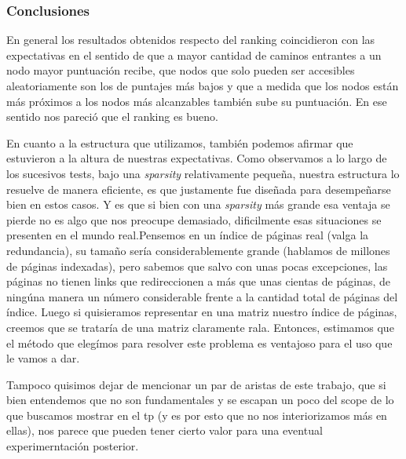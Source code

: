 \subsubsection*{Conclusiones}

En general los resultados obtenidos respecto del ranking coincidieron con las expectativas en el sentido de que a mayor cantidad de caminos entrantes a un nodo mayor puntuación recibe, que nodos que solo pueden ser accesibles aleatoriamente son los de puntajes más bajos y que a medida  que los nodos están más próximos a los nodos más alcanzables también sube su puntuación. En ese sentido nos pareció que el ranking es bueno.\\
\begin{comment}
Por supuesto asumiendo que en un caso real la cantidad de links hacia una página efectivamente responda a que su contenido es valioso para los usuarios. Lo cual es un aspecto que está totalmente fuera de evaluación en este caso.
\end{comment}

\par
En cuanto a la estructura que utilizamos, tambi\'en podemos  afirmar que estuvieron a la altura de nuestras expectativas. Como observamos a lo largo de los sucesivos tests, bajo una \textit{sparsity} relativamente pequeña, nuestra estructura lo resuelve de manera eficiente, es que justamente fue diseñada para desempeñarse bien en estos casos.\newline
Y es que si bien con una \textit{sparsity} m\'as grande esa ventaja se pierde no es algo que nos preocupe demasiado, dificilmente esas situaciones se presenten en el mundo real.\newline Pensemos en un \'indice de p\'aginas real (valga la redundancia), su tamaño ser\'ia considerablemente grande (hablamos de millones de p\'aginas indexadas), pero sabemos que salvo con unas pocas excepciones, las p\'aginas no tienen links que redireccionen a m\'as que unas cientas de p\'aginas, de ning\'una manera un n\'umero considerable frente a la cantidad total de p\'aginas del \'indice.\newline
Luego si quisieramos representar en una matriz nuestro \'indice de p\'aginas, creemos que se tratar\'ia de una matriz claramente rala.\newline
Entonces, estimamos que el m\'etodo que eleg\'imos para resolver este problema es ventajoso para el uso que le vamos a dar.
\\
\par 
Tampoco quisimos dejar de mencionar un par de aristas de este trabajo, que si bien entendemos que no son fundamentales y se escapan un poco del scope de lo que buscamos mostrar en el tp (y es por esto que no nos interiorizamos m\'as en ellas), nos parece que pueden tener cierto valor para una eventual experimerntaci\'on posterior.\newline

